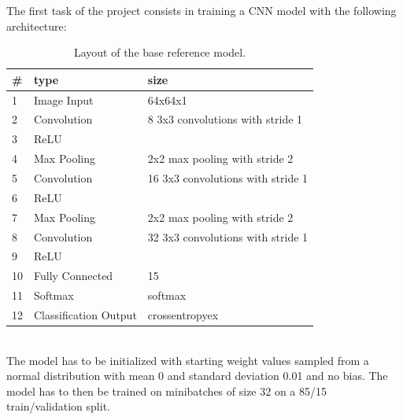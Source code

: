 \documentclass[a4paper, 11pt]{article}
\begin{document}
The first task of the project consists in training a CNN model with the following architecture:
\begin{table}[h]
    \centering
    \begin{tabular}{l|l|l}
        \textbf{\#} & \textbf{type} & \textbf{size} \\
        \hline
        1 & Image Input & 64x64x1 \\
        2 & Convolution & 8 3x3 convolutions with stride 1 \\
        3 & ReLU & \\
        4 & Max Pooling & 2x2 max pooling with stride 2 \\
        5 & Convolution & 16 3x3 convolutions with stride 1 \\
        6 & ReLU & \\
        7 & Max Pooling & 2x2 max pooling with stride 2 \\
        8 & Convolution & 32 3x3 convolutions with stride 1 \\
        9 & ReLU & \\
        10 & Fully Connected & 15 \\
        11 & Softmax & softmax \\
        12 & Classification Output & crossentropyex \\
    \end{tabular}
    \caption{Layout of the base reference model.}
    \label{tab:base_model}
\end{table}
\\
The model has to be initialized with starting weight values sampled from a normal distribution with mean 0
and standard deviation 0.01 and no bias. The model has to then be trained on minibatches of size 32 on a 
85/15 train/validation split.
\end{document}

